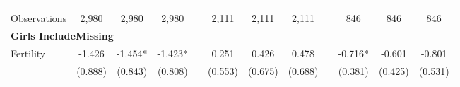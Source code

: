 \begin{landscape}
\begin{table}[htpb!]
\begin{center}
\begin{tabular}{lcccp{2mm}cccp{2mm}ccc}
\begin{footnotesize}\end{footnotesize}&\begin{footnotesize}\end{footnotesize}&\begin{footnotesize}\end{footnotesize}&\begin{footnotesize}\end{footnotesize}&\begin{footnotesize}\end{footnotesize}&\begin{footnotesize}\end{footnotesize}&\begin{footnotesize}\end{footnotesize}&\begin{footnotesize}\end{footnotesize}&\begin{footnotesize}\end{footnotesize}&\begin{footnotesize}\end{footnotesize}&\begin{footnotesize}\end{footnotesize}&\begin{footnotesize}\end{footnotesize}\\Observations&2,980&2,980&2,980&&2,111&2,111&2,111&&846&846&846\\
\multicolumn{12}{l}{\textbf{Girls IncludeMissing}}\\ 
Fertility&-1.426&-1.454*&-1.423*&&0.251&0.426&0.478&&-0.716*&-0.601&-0.801\\
&(0.888)&(0.843)&(0.808)&&(0.553)&(0.675)&(0.688)&&(0.381)&(0.425)&(0.531)\\

\end{tabular}
\end{center}
\end{table}
\end{landscape}
